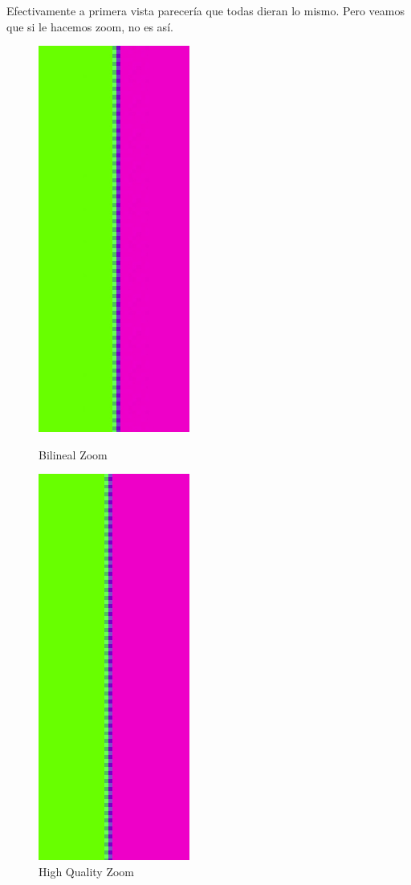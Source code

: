 Efectivamente a primera vista parecería que todas dieran lo mismo. Pero veamos que si le hacemos zoom, no es así.
\begin{figure}[!htb]
\begin{center}
    \includegraphics[scale=0.6]{imagenes/colores_bilineal_zoom.jpg}
    \caption{Bilineal Zoom}
        \end{center}
\endminipage
{}
\begin{center}
    \includegraphics[scale=0.6]{imagenes/colores_hq_zoom.jpg}
    \caption{High Quality Zoom}
        \end{center}
\endminipage 
\end{figure}
